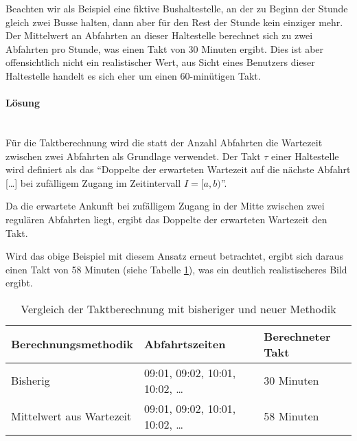 Beachten wir als Beispiel eine fiktive Bushaltestelle, an der zu Beginn der Stunde gleich zwei Busse halten, dann aber für den Rest der Stunde kein einziger mehr.
Der Mittelwert an Abfahrten an dieser Haltestelle berechnet sich zu zwei Abfahrten pro Stunde, was einen Takt von 30 Minuten ergibt.
Dies ist aber offensichtlich nicht ein realistischer Wert, aus Sicht eines Benutzers dieser Haltestelle handelt es sich eher um einen 60-minütigen Takt.

\paragraph{Lösung}~\\
Für die Taktberechnung wird die statt der Anzahl Abfahrten die Wartezeit zwischen zwei Abfahrten als Grundlage verwendet.
Der Takt $\tau$ einer Haltestelle wird definiert als das "`Doppelte der erwarteten Wartezeit auf die nächste Abfahrt [\ldots] bei zufälligem Zugang im Zeitintervall $I = [a,b)$"'.~\cite{visum_manual_formula}

Da die erwartete Ankunft bei zufälligem Zugang in der Mitte zwischen zwei regulären Abfahrten liegt, ergibt das Doppelte der erwarteten Wartezeit den Takt.

Wird das obige Beispiel mit diesem Ansatz erneut betrachtet, ergibt sich daraus einen Takt von 58 Minuten (siehe Tabelle \ref{table:Vergleich der Taktberechnung mit bisheriger und neuer Methodik}), was ein deutlich realistischeres Bild ergibt.

\begin{table}[ht]
    \centering
    \begin{tabular}[c]{l l l}
        \toprule
        \textbf{Berechnungsmethodik}
                                    & \textbf{Abfahrtszeiten}
                                    & \textbf{Berechneter Takt}\\
        \midrule
        Bisherig
                                    & 09:01, 09:02, 10:01, 10:02, \dots
                                    & 30 Minuten\\
        Mittelwert aus Wartezeit    & 09:01, 09:02, 10:01, 10:02, \dots
                                    & 58 Minuten\\
        \bottomrule
    \end{tabular}
    \caption{Vergleich der Taktberechnung mit bisheriger und neuer Methodik}
    \label{table:Vergleich der Taktberechnung mit bisheriger und neuer Methodik}
\end{table}

